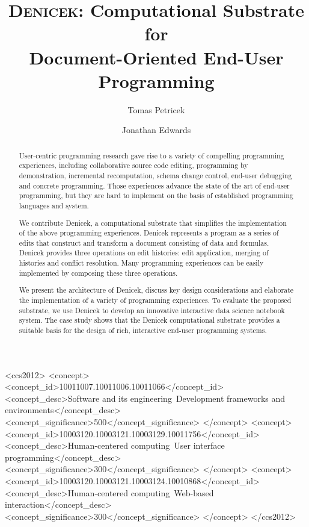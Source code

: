 \documentclass[sigconf]{acmart}
\newcommand{\note}[1]{}
\begin{document}
\title[Denicek: Computational Substrate for Document-Oriented End-User
  Programming]{{\scshape Denicek}: Computational Substrate for\\ Document-Oriented End-User Programming}

\author{Tomas Petricek}

\author{Jonathan Edwards}

\begin{abstract}
\note{Added overview figure with examples showing relationships between Denicek \& co.}
User-centric programming research gave rise to a variety of compelling programming experiences,
including collaborative source code editing, programming by demonstration, incremental
recomputation, schema change control, end-user debugging and concrete programming.
Those experiences advance the state of the art of end-user programming, but they are hard to
implement on the basis of established programming languages and system.

We contribute Denicek, a computational substrate that simplifies the implementation of the
above programming experiences. Denicek represents a program as a series of edits
that construct and transform a document consisting of data and formulas. Denicek provides three
operations on edit histories: edit application, merging of histories and conflict resolution.
Many programming experiences can be easily implemented by composing these three operations.

We present the architecture of Denicek, discuss key design considerations and elaborate
the implementation of a variety of programming experiences. To evaluate the proposed
substrate, we use Denicek to develop an innovative interactive data science notebook system.
The case study shows that the Denicek computational substrate provides a suitable basis for
the design of rich, interactive end-user programming systems.
\end{abstract}

\begin{CCSXML}
 <ccs2012>
    <concept>
        <concept_id>10011007.10011006.10011066</concept_id>
        <concept_desc>Software and its engineering~Development frameworks and environments</concept_desc>
        <concept_significance>500</concept_significance>
        </concept>
    <concept>
        <concept_id>10003120.10003121.10003129.10011756</concept_id>
        <concept_desc>Human-centered computing~User interface programming</concept_desc>
        <concept_significance>300</concept_significance>
        </concept>
    <concept>
        <concept_id>10003120.10003121.10003124.10010868</concept_id>
        <concept_desc>Human-centered computing~Web-based interaction</concept_desc>
        <concept_significance>300</concept_significance>
        </concept>
  </ccs2012>
\end{CCSXML}
\end{document}
